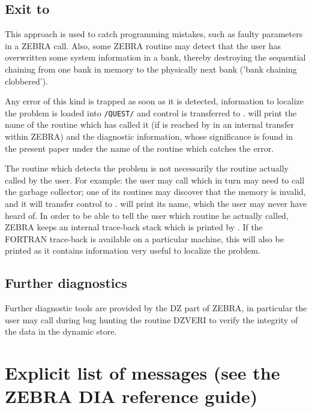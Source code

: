 \subsection{Exit to }
\par This approach is used to catch programming mistakes,
such as faulty parameters in a ZEBRA call.
Also, some ZEBRA routine may detect that the user has overwritten
some system information in a bank,
thereby destroying the sequential chaining from one bank in
memory to the physically next bank
('bank chaining clobbered').
\par Any error of this kind is trapped as soon as it is detected,
information to localize the problem is loaded into
{\tt/QUEST/} and control is transferred to .
 will print the name of the routine which has called it
(if  is reached by in an internal transfer within ZEBRA)
and the diagnostic information,
whose significance is found in the present paper under
the name of the routine which catches the error.
\par The routine which detects the problem is not necessarily the
routine actually called by the user.
For example: the user may call  which in turn may need to
call the garbage collector;
one of its routines may discover that the memory is invalid,
and it will transfer control to .
 will print its name, which the user may never have
heard of.
In order to be able to tell the user which routine he
actually called,
ZEBRA keeps an internal trace-back stack which is printed by .
If the FORTRAN trace-back is available on a particular
machine, this will also be printed as it contains information
very useful to localize the problem.
\subsection{Further diagnostics}
\par Further diagnostic tools are provided by the DZ part of ZEBRA,
in particular the user may call during bug hunting the routine
DZVERI to verify the integrity of the data in the dynamic store.
\section{Explicit list of messages (see the ZEBRA DIA reference guide)}
